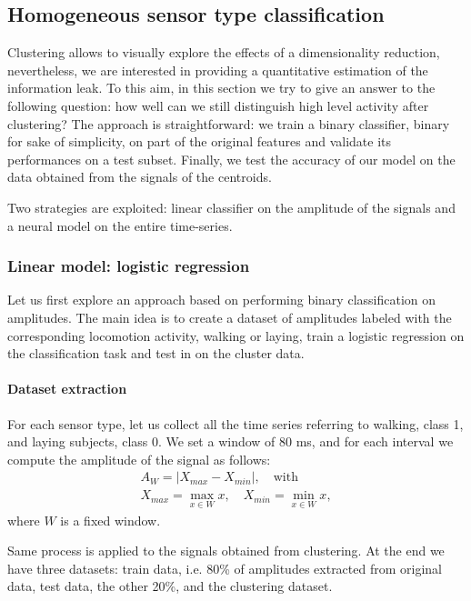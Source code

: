 \documentclass[10pt, a4paper, twocolumn]{article}
\theoremstyle{definition}
\begin{document}
\subsection{Homogeneous sensor type classification}\label{sec:homo}
Clustering allows to visually explore the effects of a dimensionality reduction, nevertheless, we are interested in providing a quantitative estimation of the information leak. To this aim, in this section we try to give an answer to the following question: how well can we still distinguish high level activity after clustering? The approach is straightforward: we train a binary classifier, binary for sake of simplicity, on part of the original features and validate its performances on a test subset. Finally, we test the accuracy of our model on the data obtained from the signals of the centroids. \par
Two strategies are exploited: linear classifier on the amplitude of the signals and a neural model on the entire time-series.

\subsubsection{Linear model: logistic regression}
Let us first explore an approach based on performing binary classification on amplitudes. The main idea is to create a dataset of amplitudes labeled with the corresponding locomotion activity, walking or laying, train a logistic regression on the classification task and test in on the cluster data. 

\paragraph{Dataset extraction} For each sensor type, let us collect all the time series referring to walking, class 1, and laying subjects, class 0. We set a window of 80 ms, and for each interval we compute the amplitude of the signal as follows:
\begin{equation}\begin{split}
A_W= |{X_{max}-X_{min}}|, \quad \text{with} \\ X_{max}=\max_{x\in W }x, \quad X_{min}=\min_{x\in W }x,
\end{split}\end{equation}
where $W$ is a fixed window. \par
Same process is applied to the signals obtained from clustering. At the end we have three datasets: train data, i.e. 80\% of amplitudes extracted from original data,  test data, the other 20\%, and the clustering dataset.
\end{document}
